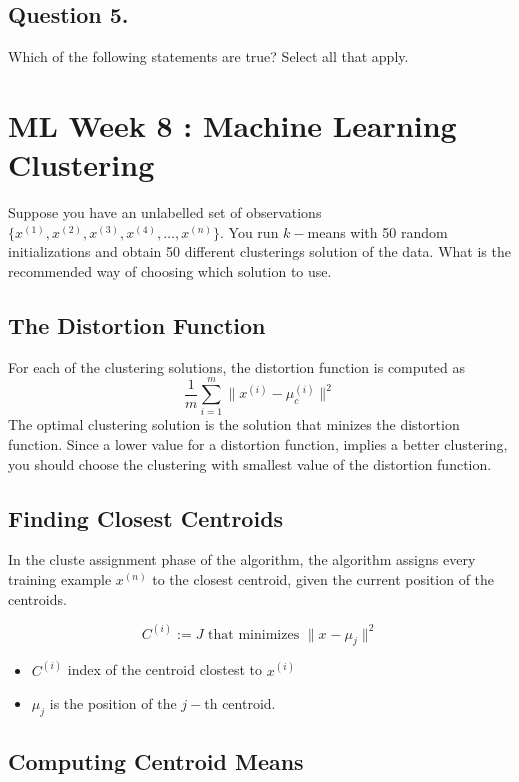 \subsection*{Question 5. }
Which of the following statements are true? Select all that apply.


\newpage
\section{ML Week 8 : Machine Learning Clustering}

Suppose you have an unlabelled set of observations$\{ x^{(1)},x^{(2)},x^{(3)},x^{(4)}, \ldots ,x^{(n)}\}$.
You run $k-$means with 50 random initializations and obtain 50 different clusterings solution of the data.
What is the recommended way of choosing which solution to use.

\subsection{The Distortion Function}
For each of the clustering solutions, the distortion function is computed as 
\[ \frac{1}{m} \sum^{m}_{i=1} \parallel x^{(i)} - \mu_c^{(i)}\parallel ^2 \]
The optimal clustering solution is the solution that minizes the distortion function.
Since a lower value for a distortion function, implies a better clustering, you should choose the clustering with 
smallest value of the distortion function.
\subsection*{Finding Closest Centroids}

In the cluste assignment phase of the algorithm, the algorithm assigns every training example $x^{(n)}$ to the closest 
centroid, given the current position of the centroids.

\[ C^{(i)} := J \mbox{ that minimizes } \| x^{} - \mu_j \| ^2 \]

\begin{itemize}
\item $C^{(i)}$ index of the centroid clostest to $x^{(i)}$
\item $\mu_j$ is the position of the $j-$th centroid.
\end{itemize}

\subsection{Computing Centroid Means}

